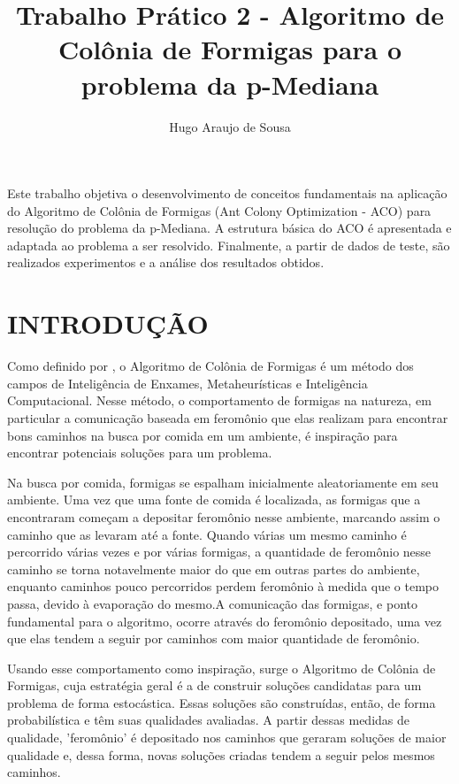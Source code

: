 \documentclass[12pt]{article}
\title{Trabalho Prático 2 - Algoritmo de Colônia de Formigas para o problema da p-Mediana}
\author{Hugo Araujo de Sousa}
\begin{document}
 

\maketitle
     
\begin{resumo}
  Este trabalho objetiva o desenvolvimento de conceitos fundamentais na
  aplicação do Algoritmo de Colônia de Formigas (Ant Colony Optimization - ACO)
  para resolução do problema da p-Mediana. A estrutura básica do ACO é apresentada
  e adaptada ao problema a ser resolvido. Finalmente, a partir de dados de teste,
  são realizados experimentos e a análise dos resultados obtidos.
\end{resumo}

\section{INTRODUÇÃO}

Como definido por \cite{clalg:11}, o Algoritmo de Colônia de Formigas é um método
dos campos de Inteligência de Enxames, Metaheurísticas e Inteligência Computacional.
Nesse método, o comportamento de formigas na natureza, em particular a comunicação
baseada em feromônio que elas realizam para encontrar bons caminhos na busca por comida
em um ambiente, é inspiração para encontrar potenciais soluções para um problema.

Na busca por comida, formigas se espalham inicialmente aleatoriamente em seu ambiente.
Uma vez que uma fonte de comida é localizada, as formigas que a encontraram começam a
depositar feromônio nesse ambiente, marcando assim o caminho que as levaram até a fonte.
Quando várias um mesmo caminho é percorrido várias vezes e por várias formigas, a quantidade
de feromônio nesse caminho se torna notavelmente maior do que em outras partes do ambiente,
enquanto caminhos pouco percorridos perdem feromônio à medida que o tempo passa, devido à
evaporação do mesmo.A comunicação das formigas, e ponto fundamental para o algoritmo,
ocorre através do feromônio depositado, uma vez que elas tendem a seguir por caminhos com
maior quantidade de feromônio.

Usando esse comportamento como inspiração, surge o Algoritmo de Colônia de Formigas, cuja 
estratégia geral é a de construir soluções candidatas para um problema de forma estocástica.
Essas soluções são construídas, então, de forma probabilística e têm suas qualidades avaliadas.
A partir dessas medidas de qualidade, 'feromônio' é depositado nos caminhos que geraram soluções
de maior qualidade e, dessa forma, novas soluções criadas tendem a seguir pelos mesmos caminhos.
\end{document}
